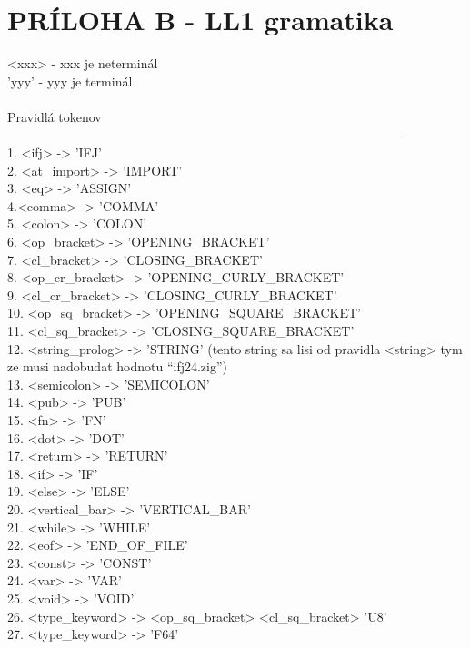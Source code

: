\documentclass[Slovak, a4paper, 12pt]{article}
\begin{document}
	\newpage
	\section{PRÍLOHA B - LL1 gramatika}
	<xxx> - xxx je neterminál\\
	'yyy' - yyy je terminál\\
	\\
	Pravidlá tokenov\\
	----------------------------------------------------------------------------------------------\\
	1. <ifj> -> 'IFJ'\\
	2. <at\_import> -> 'IMPORT'\\
	3. <eq> -> 'ASSIGN'\\
	4.<comma> -> 'COMMA'\\
	5. <colon> -> 'COLON'\\
	6. <op\_bracket> -> 'OPENING\_BRACKET'\\
	7. <cl\_bracket> -> 'CLOSING\_BRACKET'\\
	8. <op\_cr\_bracket> -> 'OPENING\_CURLY\_BRACKET'\\
	9. <cl\_cr\_bracket> -> 'CLOSING\_CURLY\_BRACKET'\\
	10. <op\_sq\_bracket> -> 'OPENING\_SQUARE\_BRACKET'\\
	11. <cl\_sq\_bracket> -> 'CLOSING\_SQUARE\_BRACKET'\\
	12. <string\_prolog> -> 'STRING' (tento string sa lisi od pravidla <string> tym ze musi nadobudat hodnotu ``ifj24.zig'')\\
	13. <semicolon> -> 'SEMICOLON'\\
	14. <pub> -> 'PUB'\\
	15. <fn> -> 'FN'\\
	16. <dot> -> 'DOT'\\
	17. <return> -> 'RETURN'\\
	18. <if> -> 'IF'\\
	19. <else> -> 'ELSE'\\
	20. <vertical\_bar> -> 'VERTICAL\_BAR'\\
	21. <while> -> 'WHILE'\\
	22. <eof> -> 'END\_OF\_FILE'\\
	23. <const> -> 'CONST'\\
	24. <var> -> 'VAR'\\
	25. <void> -> 'VOID'\\
	26. <type\_keyword> -> <op\_sq\_bracket> <cl\_sq\_bracket> 'U8'\\
	27. <type\_keyword> -> 'F64'\\
\end{document}
